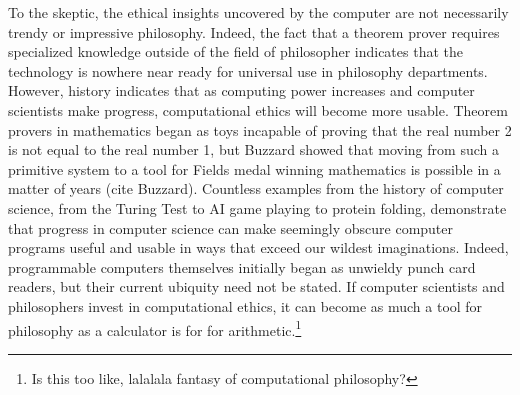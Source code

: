 \begin{isabellebody}
\begin{isamarkuptext}
To the skeptic, the ethical insights uncovered by the computer are not necessarily trendy or impressive 
philosophy. Indeed, the fact that a theorem prover requires specialized knowledge outside of the field 
of philosopher indicates that the technology is nowhere near ready for universal use in philosophy 
departments. However, history indicates that as computing power increases and computer scientists make 
progress, computational ethics will become more usable. Theorem provers in mathematics began as toys 
incapable of proving that the real number 2 is not equal to the real number 1, but Buzzard showed that 
moving from such a primitive system to a tool for Fields medal winning mathematics is possible in a 
matter of years (cite Buzzard). Countless examples from the history of computer science, from the Turing 
Test to AI game playing to protein folding, demonstrate that progress in computer science can make seemingly 
obscure computer programs useful and usable in ways that exceed our wildest imaginations. Indeed, 
programmable computers themselves initially began as unwieldy punch card readers, but their current ubiquity 
need not be stated. If computer scientists and philosophers invest in computational ethics, it can 
become as much a tool for philosophy as a calculator is for for arithmetic.\footnote{Is this too like, 
lalalala fantasy of computational philosophy?}%
\end{isamarkuptext}\isamarkuptrue%
%
\isadelimtheory
%
\endisadelimtheory
%
\isatagtheory
%
\endisatagtheory
{\isafoldtheory}%
%
\isadelimtheory
%
\endisadelimtheory
%
\end{isabellebody}%
\endinput
